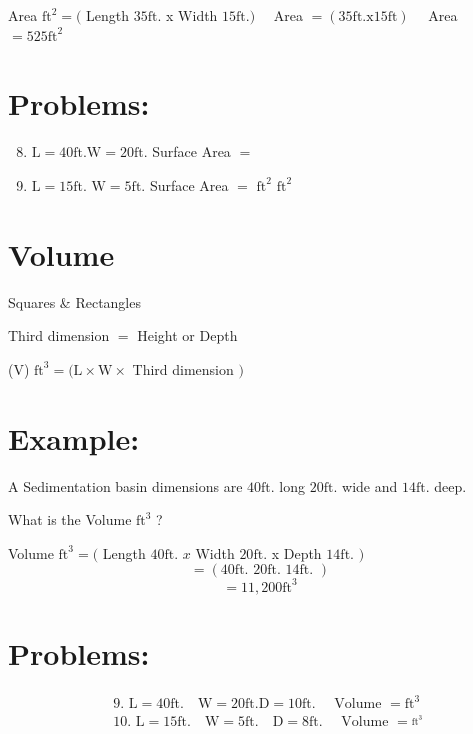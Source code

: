 \documentclass[10pt]{article}
\begin{document}
Area $\mathrm{ft}^{2}=($ Length $35 \mathrm{ft}$. x Width $15 \mathrm{ft} .) \quad$ Area $=(35 \mathrm{ft} . \mathrm{x} 15 \mathrm{ft}) \quad$ Area $=525 \mathrm{ft}^{2}$

\section{Problems:}
\begin{enumerate}
  \setcounter{enumi}{7}
  \item $\mathrm{L}=40 \mathrm{ft} . \mathrm{W}=20 \mathrm{ft}$. Surface Area $=$

  \item $\mathrm{L}=15 \mathrm{ft}$. $\mathrm{W}=5 \mathrm{ft}$. Surface Area $=$ $\mathrm{ft}^{2}$ $\mathrm{ft}^{2}$

\end{enumerate}
\section{Volume}
Squares \& Rectangles

Third dimension $=$ Height or Depth

(V) $\mathrm{ft}^{3}=(\mathrm{L} \times \mathrm{W} \times$ Third dimension $)$

\section{Example:}
A Sedimentation basin dimensions are $40 \mathrm{ft}$. long $20 \mathrm{ft}$. wide and $14 \mathrm{ft}$. deep.

What is the Volume $\mathrm{ft}^{3}$ ?

Volume $\mathrm{ft}^{3}=($ Length $40 \mathrm{ft}$. $x$ Width $20 \mathrm{ft}$. x Depth $14 \mathrm{ft}$. $)$
$$
=(40 \mathrm{ft} \text {. } 20 \mathrm{ft} \text {. } 14 \mathrm{ft} \text {. })
$$
$$
=11,200 \mathrm{ft}^{3}
$$

\section{Problems:}
$$
\begin{aligned}
& \text { 9. } \mathrm{L}=40 \mathrm{ft} . \quad \mathrm{W}=20 \mathrm{ft} . \mathrm{D}=10 \mathrm{ft} . \quad \text { Volume }=\mathrm{ft}^{3} \\
& \text { 10. } \mathrm{L}=15 \mathrm{ft} . \quad \mathrm{W}=5 \mathrm{ft} . \quad \mathrm{D}=8 \mathrm{ft} . \quad \text { Volume }=\stackrel{\mathrm{ft}^{3}}{ }
\end{aligned}
$$
\end{document}
